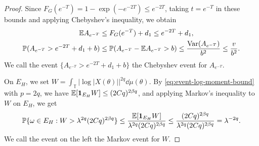 \begin{proof}
Since $F_G(e^{-T})=1-\exp(-e^{-2T})\leq e^{-2T}$, taking $t=e^{-T}$ in
these bounds and applying Chebyshev's inequality, we obtain
\begin{align*}
 \mathbb E A_{e^{-T}}
 &\leq F_G(e^{-T})+d_1
 \leq e^{-2T}+d_1,\\
 \mathbb P(A_{e^{-T}}>e^{-2T}+d_1+b)
 &\leq\mathbb P(A_{e^{-T}}-\mathbb E A_{e^{-T}}>b)
 \leq\frac{\operatorname{Var}(A_{e^{-T}})}{b^2}
 \leq\frac v{b^2}.
\end{align*}
We call the event $\{A_{e^{-T}}>e^{-2T}+d_1+b\}$ the Chebyshev event for
$A_{e^{-T}}$.

On $E_H$, we set
$W=\int_{\mathbb T}|\log|X(\theta)||^{2q}\dd\mu(\theta)$.
By \eqref{eq:event-log-moment-bound} with $p=2q$, we have
$\mathbb E[\boldsymbol1_{E_H}W]\leq(2Cq)^{2\beta q}$, and applying Markov's
inequality to $W$ on $E_H$, we get
\[
 \mathbb P\{\omega\in E_H:W>\lambda^{2q}(2Cq)^{2\beta q}\}
 \leq\frac{\mathbb E[\boldsymbol1_{E_H}W]}
              {\lambda^{2q}(2Cq)^{2\beta q}}
 \leq\frac{(2Cq)^{2\beta q}}{\lambda^{2q}(2Cq)^{2\beta q}}
 =\lambda^{-2q}.
\]
We call the event on the left the Markov event for $W$.


\end{proof}
